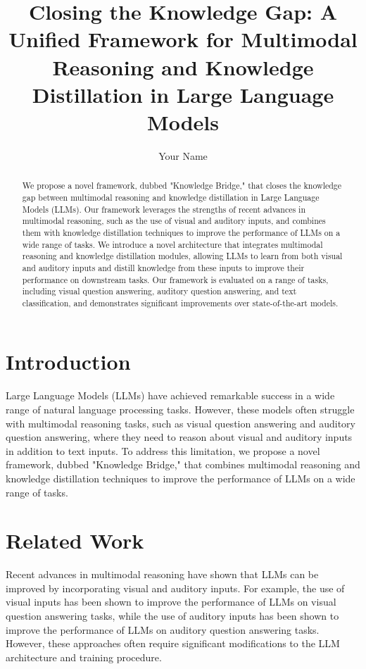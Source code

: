 \documentclass{article}
\begin{document}
\title{Closing the Knowledge Gap: A Unified Framework for Multimodal Reasoning and Knowledge Distillation in Large Language Models}

\author{Your Name}

\maketitle

\begin{abstract}
We propose a novel framework, dubbed "Knowledge Bridge," that closes the knowledge gap between multimodal reasoning and knowledge distillation in Large Language Models (LLMs). Our framework leverages the strengths of recent advances in multimodal reasoning, such as the use of visual and auditory inputs, and combines them with knowledge distillation techniques to improve the performance of LLMs on a wide range of tasks. We introduce a novel architecture that integrates multimodal reasoning and knowledge distillation modules, allowing LLMs to learn from both visual and auditory inputs and distill knowledge from these inputs to improve their performance on downstream tasks. Our framework is evaluated on a range of tasks, including visual question answering, auditory question answering, and text classification, and demonstrates significant improvements over state-of-the-art models.
\end{abstract}

\section{Introduction}

Large Language Models (LLMs) have achieved remarkable success in a wide range of natural language processing tasks. However, these models often struggle with multimodal reasoning tasks, such as visual question answering and auditory question answering, where they need to reason about visual and auditory inputs in addition to text inputs. To address this limitation, we propose a novel framework, dubbed "Knowledge Bridge," that combines multimodal reasoning and knowledge distillation techniques to improve the performance of LLMs on a wide range of tasks.

\section{Related Work}

Recent advances in multimodal reasoning have shown that LLMs can be improved by incorporating visual and auditory inputs. For example, the use of visual inputs has been shown to improve the performance of LLMs on visual question answering tasks, while the use of auditory inputs has been shown to improve the performance of LLMs on auditory question answering tasks. However, these approaches often require significant modifications to the LLM architecture and training procedure.
\end{document}
